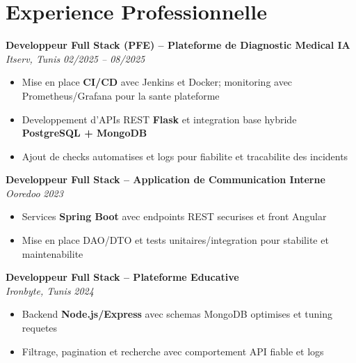 \documentclass[10pt,a4paper]{article}
\begin{document}
\vspace{6pt}

\section*{Experience Professionnelle}
{\small

\textbf{Developpeur Full Stack (PFE) -- Plateforme de Diagnostic Medical IA}\\[1pt]
\textit{Itserv, Tunis} \hfill \textit{02/2025 -- 08/2025}
\begin{itemize}
  \item Mise en place \textbf{CI/CD} avec Jenkins et Docker; monitoring avec Prometheus/Grafana pour la sante plateforme
  \item Developpement d'APIs REST \textbf{Flask} et integration base hybride \textbf{PostgreSQL + MongoDB}
  \item Ajout de checks automatises et logs pour fiabilite et tracabilite des incidents
\end{itemize}

\vspace{3pt}
\textbf{Developpeur Full Stack -- Application de Communication Interne}\\[1pt]
\textit{Ooredoo} \hfill \textit{2023}
\begin{itemize}
  \item Services \textbf{Spring Boot} avec endpoints REST securises et front Angular
  \item Mise en place DAO/DTO et tests unitaires/integration pour stabilite et maintenabilite
\end{itemize}

\vspace{3pt}
\textbf{Developpeur Full Stack -- Plateforme Educative}\\[1pt]
\textit{Ironbyte, Tunis} \hfill \textit{2024}
\begin{itemize}
  \item Backend \textbf{Node.js/Express} avec schemas MongoDB optimises et tuning requetes
  \item Filtrage, pagination et recherche avec comportement API fiable et logs
\end{itemize}

}

\vspace{4pt}
\end{document}
